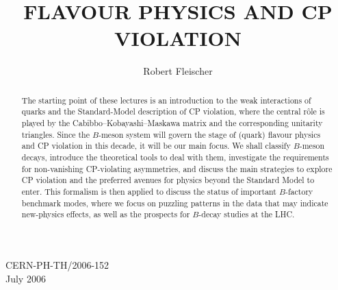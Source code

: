 \documentclass[11pt]{cernrep}
\begin{document}
\vfill
\noindent
CERN-PH-TH/2006-152\\
July 2006

\newpage
\thispagestyle{empty}
\vbox{}
\newpage
 
\setcounter{page}{1}



\pagestyle{plain}

\setcounter{page}{1}

\tableofcontents

\newpage

\setcounter{page}{1}



\title{FLAVOUR PHYSICS AND CP VIOLATION}
\author{Robert Fleischer}
\maketitle
\begin{abstract}
The starting point of these lectures is an introduction to the weak 
interactions of quarks and the Standard-Model description of CP violation, 
where the central r\^ole is played by the Cabibbo--Kobayashi--Maskawa matrix 
and the corresponding unitarity triangles. Since the $B$-meson system will govern 
the stage of (quark) flavour physics and CP violation in this decade, 
it will be our main focus. We  shall classify $B$-meson decays, introduce the 
theoretical tools to deal with them, investigate the requirements for non-vanishing 
CP-violating asymmetries, and discuss the main strategies to explore
CP violation and the preferred avenues for physics beyond the Standard Model
to enter. This formalism is then applied to discuss the status of important 
$B$-factory benchmark modes, where we focus on puzzling patterns in the
data that may indicate new-physics effects, as well as the prospects for 
$B$-decay studies at the LHC.
\end{abstract}



\pagestyle{plain}




\pagestyle{plain}


%
%
%
\end{document}
